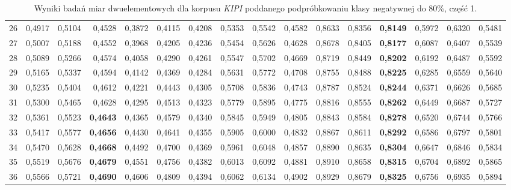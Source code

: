 \begin{table}[htp!]
\begin{adjustwidth}{-2cm}{}
\begin{tabular}{ l | *{15}{| r}}
26	&	0,4917	&	0,5104	&	0,4528	&	0,3872	&	0,4115	&	0,4208	&	0,5353	&	0,5542	&	0,4582	&	0,8633	&	0,8356	&	\textbf{0,8149}	&	0,5972	&	0,6320	&	0,5481	\\
27	&	0,5007	&	0,5188	&	0,4552	&	0,3968	&	0,4205	&	0,4236	&	0,5454	&	0,5626	&	0,4628	&	0,8678	&	0,8405	&	\textbf{0,8177}	&	0,6087	&	0,6407	&	0,5539	\\
28	&	0,5089	&	0,5266	&	0,4574	&	0,4058	&	0,4290	&	0,4261	&	0,5547	&	0,5702	&	0,4669	&	0,8719	&	0,8449	&	\textbf{0,8202}	&	0,6192	&	0,6487	&	0,5592	\\
29	&	0,5165	&	0,5337	&	0,4594	&	0,4142	&	0,4369	&	0,4284	&	0,5631	&	0,5772	&	0,4708	&	0,8755	&	0,8488	&	\textbf{0,8225}	&	0,6285	&	0,6559	&	0,5640	\\
30	&	0,5235	&	0,5404	&	0,4612	&	0,4221	&	0,4443	&	0,4305	&	0,5708	&	0,5836	&	0,4743	&	0,8787	&	0,8524	&	\textbf{0,8244}	&	0,6371	&	0,6626	&	0,5685	\\
31	&	0,5300	&	0,5465	&	0,4628	&	0,4295	&	0,4513	&	0,4323	&	0,5779	&	0,5895	&	0,4775	&	0,8816	&	0,8555	&	\textbf{0,8262}	&	0,6449	&	0,6687	&	0,5727	\\
32	&	0,5361	&	0,5523	&	\textbf{0,4643}	&	0,4365	&	0,4579	&	0,4340	&	0,5845	&	0,5949	&	0,4805	&	0,8843	&	0,8584	&	\textbf{0,8278}	&	0,6520	&	0,6744	&	0,5766	\\
33	&	0,5417	&	0,5577	&	\textbf{0,4656}	&	0,4430	&	0,4641	&	0,4355	&	0,5905	&	0,6000	&	0,4832	&	0,8867	&	0,8611	&	\textbf{0,8292}	&	0,6586	&	0,6797	&	0,5801	\\
34	&	0,5470	&	0,5628	&	\textbf{0,4668}	&	0,4492	&	0,4700	&	0,4369	&	0,5961	&	0,6048	&	0,4857	&	0,8890	&	0,8635	&	\textbf{0,8304}	&	0,6647	&	0,6846	&	0,5834	\\
35	&	0,5519	&	0,5676	&	\textbf{0,4679}	&	0,4551	&	0,4756	&	0,4382	&	0,6013	&	0,6092	&	0,4881	&	0,8910	&	0,8658	&	\textbf{0,8315}	&	0,6704	&	0,6892	&	0,5865	\\
36	&	0,5566	&	0,5721	&	\textbf{0,4690}	&	0,4606	&	0,4809	&	0,4394	&	0,6062	&	0,6134	&	0,4902	&	0,8929	&	0,8679	&	\textbf{0,8325}	&	0,6756	&	0,6935	&	0,5894	\\
	\bottomrule
\end{tabular}
 \end{adjustwidth}
\caption[Wyniki badań miar dwuelementowych dla korpusu \emph{KIPI} poddanego podpróbkowaniu klasy negatywnej do 80\%, część 1]{Wyniki badań miar dwuelementowych dla korpusu \emph{KIPI} poddanego podpróbkowaniu klasy negatywnej do 80\%, część 1.}
\label{KIPI_subsampled_20_part_1}
\end{table}

